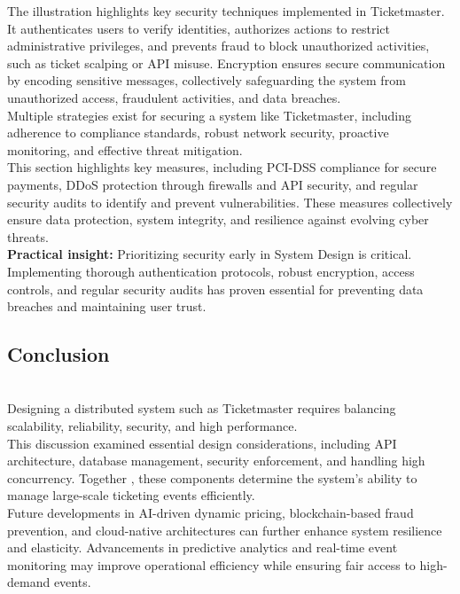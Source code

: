 The illustration highlights key security techniques implemented in Ticketmaster.
\\
It authenticates users to verify identities, authorizes actions to restrict administrative privileges, and prevents fraud to block unauthorized activities, such as ticket scalping or API misuse. Encryption ensures secure communication by encoding sensitive messages, collectively safeguarding the system from unauthorized access, fraudulent activities, and data breaches.
\\
Multiple strategies exist for securing a system like Ticketmaster, including adherence to compliance standards, robust network security, proactive monitoring, and effective threat mitigation.
\\
This section highlights key measures, including PCI-DSS compliance for secure payments, DDoS protection through firewalls and API security, and regular security audits to identify and prevent vulnerabilities. These measures collectively ensure data protection, system integrity, and resilience against evolving cyber threats.
\\
\textbf{Practical insight:} Prioritizing security early in System Design is critical. Implementing thorough authentication protocols, robust encryption, access controls, and regular security audits has proven essential for preventing data breaches and maintaining user trust.

\subsection{Conclusion}\label{pvOXYU5rovDkno0JYtB4d}
\\
Designing a distributed system such as Ticketmaster requires balancing scalability, reliability, security, and high performance.
\\
This discussion examined essential design considerations, including API architecture, database management, security enforcement, and handling high concurrency. Together , these components determine the system's ability to manage large-scale ticketing events efficiently.
\\
Future developments in AI-driven dynamic pricing, blockchain-based fraud prevention, and cloud-native architectures can further enhance system resilience and elasticity. Advancements in predictive analytics and real-time event monitoring may improve operational efficiency while ensuring fair access to high-demand events.

